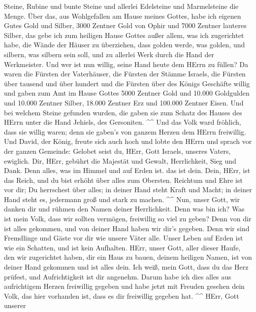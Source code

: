 Steine, Rubine und bunte Steine und allerlei Edelsteine und Marmelsteine
die Menge.  Über das, aus Wohlgefallen am Hause meines
Gottes, habe ich eigenen Gutes Gold und Silber,  3000
Zentner Gold von Ophir und 7000 Zentner lauteres Silber, das gebe ich
zum heiligen Hause Gottes außer allem, was ich zugerichtet habe, die
Wände der Häuser zu überziehen,  dass golden werde, was
golden, und silbern, was silbern sein soll, und zu allerlei Werk durch
die Hand der Werkmeister. Und wer ist nun willig, seine Hand heute dem
HErrn zu füllen?  Da waren die Fürsten der Vaterhäuser, die
Fürsten der Stämme Israels, die Fürsten über tausend und über hundert
und die Fürsten über des Königs Geschäfte willig  und gaben
zum Amt im Hause Gottes 5000 Zentner Gold und 10.000 Goldgulden und
10.000 Zentner Silber, 18.000 Zentner Erz und 100.000 Zentner Eisen.
 Und bei welchem Steine gefunden wurden, die gaben sie zum
Schatz des Hauses des HErrn unter die Hand Jehiels, des Gersoniten.
\^{}\^{}  Und das Volk ward fröhlich, dass sie willig waren;
denn sie gaben's von ganzem Herzen dem HErrn freiwillig. Und David, der
König, freute sich auch hoch  und lobte den HErrn und
sprach vor der ganzen Gemeinde: Gelobet seist du, HErr, Gott Israels,
unseres Vaters, ewiglich.  Dir, HErr, gebührt die Majestät
und Gewalt, Herrlichkeit, Sieg und Dank. Denn alles, was im Himmel und
auf Erden ist. das ist dein. Dein, HErr, ist das Reich, und du bist
erhöht über alles zum Obersten.  Reichtum und Ehre ist vor
dir; Du herrschest über alles; in deiner Hand steht Kraft und Macht; in
deiner Hand steht es, jedermann groß und stark zu machen. \^{}\^{}
 Nun, unser Gott, wir danken dir und rühmen den Namen
deiner Herrlichkeit.  Denn was bin ich? Was ist mein Volk,
dass wir sollten vermögen, freiwillig so viel zu geben? Denn von dir ist
alles gekommen, und von deiner Hand haben wir dir's gegeben.
 Denn wir sind Fremdlinge und Gäste vor dir wie unsere
Väter alle. Unser Leben auf Erden ist wie ein Schatten, und ist kein
Aufhalten.  HErr, unser Gott, aller dieser Haufe, den wir
zugerichtet haben, dir ein Haus zu bauen, deinem heiligen Namen, ist von
deiner Hand gekommen und ist alles dein.  Ich weiß, mein
Gott, dass du das Herz prüfest, und Aufrichtigkeit ist dir angenehm.
Darum habe ich dies alles aus aufrichtigem Herzen freiwillig gegeben und
habe jetzt mit Freuden gesehen dein Volk, das hier vorhanden ist, dass
es dir freiwillig gegeben hat. \^{}\^{}  HErr, Gott unserer
